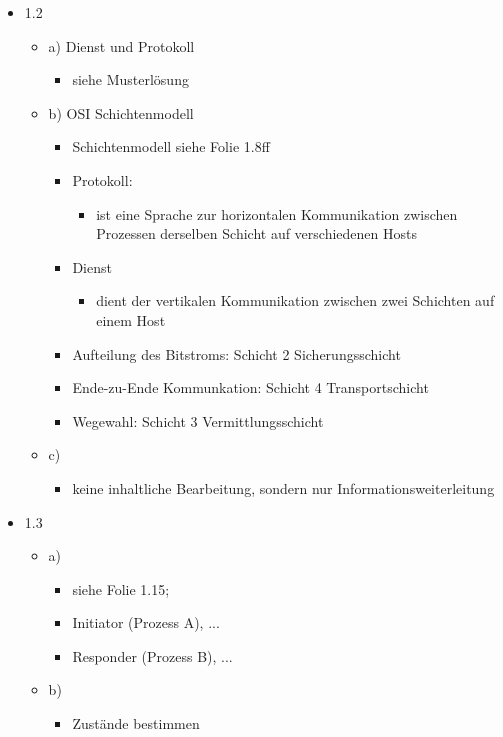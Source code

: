 \documentclass[a4paper, 12pt] {article} %
\begin{document}
\begin{itemize}
\begin{itemize}
\begin{itemize}
	\end{itemize}
\end{itemize}
\item 1.2
\begin{itemize}
	\item a) Dienst und Protokoll
	\begin{itemize}
		\item siehe Musterlösung
	\end{itemize}
	\item b) OSI Schichtenmodell
	\begin{itemize}
		\item Schichtenmodell siehe Folie 1.8ff
		\item Protokoll:
		\begin{itemize}
			\item ist eine Sprache zur horizontalen Kommunikation 							zwischen Prozessen derselben Schicht auf verschiedenen 						Hosts
		\end{itemize}
		\item Dienst
		\begin{itemize}
			\item dient der vertikalen Kommunikation zwischen zwei 							Schichten auf einem Host
		\end{itemize}
		\item Aufteilung des Bitstroms: Schicht 2 Sicherungsschicht
		\item Ende-zu-Ende Kommunkation: Schicht 4 Transportschicht
		\item Wegewahl: Schicht 3 Vermittlungsschicht
	\end{itemize}
	\item c)
	\begin{itemize}
		\item keine inhaltliche Bearbeitung, sondern nur 								Informationsweiterleitung
	\end{itemize}
\end{itemize}
\item 1.3
\begin{itemize}
	\item a)
	\begin{itemize}
		\item siehe Folie 1.15; 
		\item Initiator (Prozess A), ...
		\item Responder (Prozess B), ...
	\end{itemize}
	\item b)
	\begin{itemize}
		\item Zustände bestimmen

\end{itemize}
\end{itemize}
\end{itemize}
\end{document}
